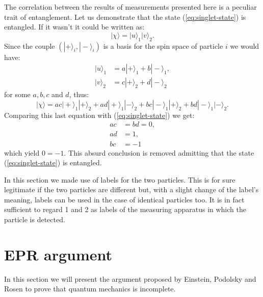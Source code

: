 \begin{observation}
  The correlation between the results of measurements presented here is a peculiar trait of entanglement. Let us demonstrate that the state (\ref{eq:singlet-state}) is entangled. If it wasn't it could be written as:
\begin{equation*}
  |\chi\rangle = |u\rangle_1 |v\rangle_2.
\end{equation*}
Since the couple $\left(|+\rangle_i, |-\rangle_i\right)$ is a basis for the spin space of particle $i$ we would have:
\begin{equation*}
  \begin{split}
    |u\rangle_1 &= a |+\rangle_1 + b |-\rangle_1,\\
    |v\rangle_2 &= c |+\rangle_2 + d |-\rangle_2
  \end{split}
\end{equation*}
for some $a, b, c$ and $d$, thus:
\begin{equation*}
  |\chi\rangle = a c |+\rangle_1 |+\rangle_2 + a d |+\rangle_1 |-\rangle_2 + b c |-\rangle_1 |+\rangle_2 + b d |-\rangle_1 |-\rangle_2.
\end{equation*}
Comparing this last equation with (\ref{eq:singlet-state}) we get:
\begin{equation*}
  \begin{split}
    a c &= b d = 0,\\
    a d &= 1,\\
    b c &= - 1
  \end{split}
\end{equation*}
which yield $0 = -1$. This absurd conclusion is removed admitting that the state (\ref{eq:singlet-state}) is entangled.
\end{observation}

\begin{observation}
  In this section we made use of labels for the two particles. This is for sure legitimate if the two particles are different but, with a slight change of the label's meaning, labels can be used in the case of identical particles too. It is in fact sufficient to regard 1 and 2 as labels of the measuring apparatus in which the particle is detected.%
\end{observation}


\section{EPR argument}
\label{epr-argument}
In this section we will present the argument proposed by Einstein, Podolsky and Rosen \cite{PhysRev.47.777} to prove that quantum mechanics is incomplete.

